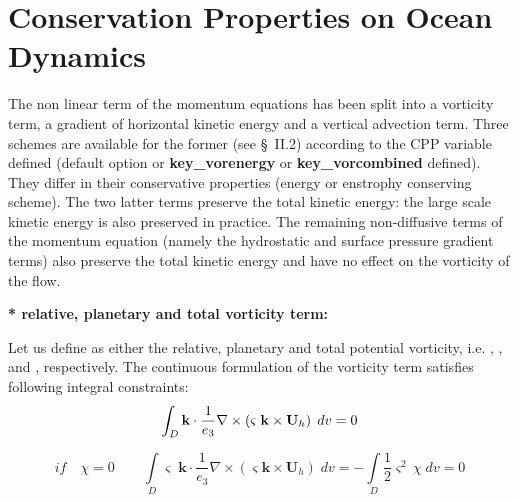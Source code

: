 \section{Conservation Properties on Ocean Dynamics}
\label{Invariant_dyn}

The non linear term of the momentum equations has been split into a 
vorticity term, a gradient of horizontal kinetic energy and a vertical 
advection term. Three schemes are available for the former (see {\S}~II.2) 
according to the CPP variable defined (default option\textbf{ 
}or \textbf{key{\_}vorenergy } or \textbf{key{\_}vorcombined 
} defined). They differ in their conservative 
properties (energy or enstrophy conserving scheme). The two latter terms 
preserve the total kinetic energy: the large scale kinetic energy is also 
preserved in practice. The remaining non-diffusive terms of the momentum 
equation (namely the hydrostatic and surface pressure gradient terms) also 
preserve the total kinetic energy and have no effect on the vorticity of the 
flow.

\textbf{* relative, planetary and total vorticity term:}

Let us define as either the relative, planetary and total potential 
vorticity, i.e. , , and , respectively. The continuous formulation of the 
vorticity term satisfies following integral constraints:
\begin{equation} \label{Eq_vor_vorticity}
\int_D {{\textbf {k}}\cdot \frac{1}{e_3 }\nabla \times \left( {\varsigma 
\;{\rm {\bf k}}\times {\textbf {U}}_h } \right)\;dv} =0
\end{equation}

\begin{equation} \label{Eq_vor_enstrophy}
if\quad \chi =0\quad \quad \int\limits_D {\varsigma \;{\textbf{k}}\cdot 
\frac{1}{e_3 }\nabla \times \left( {\varsigma {\textbf{k}}\times {\textbf{U}}_h } \right)\;dv} =-\int\limits_D {\frac{1}{2}\varsigma ^2\,\chi \;dv} 
=0
\end{equation}

